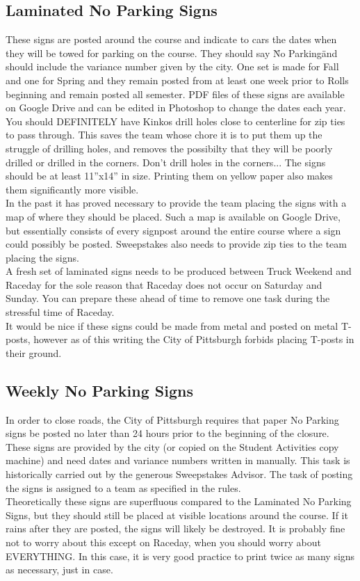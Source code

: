 \subsection{Laminated No Parking Signs}
These signs are posted around the course and indicate to cars the dates when
they will be towed for parking on the course. They should say \"No Parking\"
and should include the variance number given by the city. One set is made for
Fall and one for Spring and they remain posted from at least one week prior
to Rolls beginning and remain posted all semester. PDF files of these signs
are available on Google Drive and can be edited in Photoshop to change the
dates each year.
\\
You should DEFINITELY have
Kinkos drill holes close to centerline for zip ties to pass through. This
saves the team whose chore it is to put them up the struggle of drilling holes,
and removes the possibilty that they will be poorly drilled or drilled in the
corners. Don't drill holes in the corners... The signs should
be at least 11''x14'' in size. Printing them on yellow paper also makes them
significantly more visible.
\\
In the past it has proved necessary to provide the team placing the signs
with a map of where they should be placed. Such a map is available on Google
Drive, but essentially consists of every signpost around the entire course
where a sign could possibly be posted. Sweepstakes also needs to provide
zip ties to the team placing the signs.
\\
A fresh set of laminated signs needs to be produced between Truck Weekend
and Raceday for the sole reason that Raceday does not occur on Saturday and
Sunday. You can prepare these ahead of time to remove one task during the
stressful time of Raceday.
\\
It would be nice if these signs could be made from metal and posted on metal
T-posts, however as of this writing the City of Pittsburgh forbids placing
T-posts in their ground.

\subsection{Weekly No Parking Signs}
In order to close roads, the City of Pittsburgh requires that paper No
Parking signs be posted no later than 24 hours prior to the beginning of the
closure. These signs are provided by the city (or copied on the Student
Activities copy machine) and need dates and variance numbers written in
manually. This task is historically carried out by the generous Sweepstakes
Advisor. The task of posting the signs is assigned to a team as
specified in the rules.
\\
Theoretically these signs are superfluous compared to the Laminated No
Parking Signs, but they should still be placed at visible locations around
the course. If it rains after they are posted, the signs will likely be
destroyed. It is probably fine not to worry about this except on Raceday,
when you should worry about EVERYTHING. In this case, it is very good practice
to print twice as many signs as necessary, just in case.

